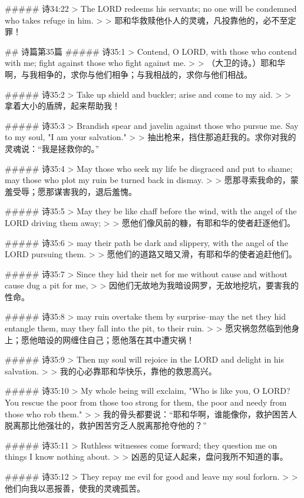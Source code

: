 ##### 诗34:22
> The LORD redeems his servants; no one will be condemned who takes refuge in him.
>
> 耶和华救赎他仆人的灵魂，凡投靠他的，必不至定罪！


## 诗篇第35篇
##### 诗35:1
> Contend, O LORD, with those who contend with me; fight against those who fight against me.
>
> （大卫的诗。）耶和华啊，与我相争的，求你与他们相争；与我相战的，求你与他们相战。


##### 诗35:2
> Take up shield and buckler; arise and come to my aid.
>
> 拿着大小的盾牌，起来帮助我！


##### 诗35:3
> Brandish spear and javelin against those who pursue me. Say to my soul, "I am your salvation."
>
> 抽出枪来，挡住那追赶我的。求你对我的灵魂说：“我是拯救你的。”


##### 诗35:4
> May those who seek my life be disgraced and put to shame; may those who plot my ruin be turned back in dismay.
>
> 愿那寻索我命的，蒙羞受辱；愿那谋害我的，退后羞愧。


##### 诗35:5
> May they be like chaff before the wind, with the angel of the LORD driving them away;
>
> 愿他们像风前的糠，有耶和华的使者赶逐他们。


##### 诗35:6
> may their path be dark and slippery, with the angel of the LORD pursuing them.
>
> 愿他们的道路又暗又滑，有耶和华的使者追赶他们。


##### 诗35:7
> Since they hid their net for me without cause and without cause dug a pit for me,
>
> 因他们无故地为我暗设网罗，无故地挖坑，要害我的性命。


##### 诗35:8
> may ruin overtake them by surprise--may the net they hid entangle them, may they fall into the pit, to their ruin.
>
> 愿灾祸忽然临到他身上；愿他暗设的网缠住自己；愿他落在其中遭灾祸！


##### 诗35:9
> Then my soul will rejoice in the LORD and delight in his salvation.
>
> 我的心必靠耶和华快乐，靠他的救恩高兴。


##### 诗35:10
> My whole being will exclaim, "Who is like you, O LORD? You rescue the poor from those too strong for them, the poor and needy from those who rob them."
>
> 我的骨头都要说：“耶和华啊，谁能像你，救护困苦人脱离那比他强壮的，救护困苦穷乏人脱离那抢夺他的？”


##### 诗35:11
> Ruthless witnesses come forward; they question me on things I know nothing about.
>
> 凶恶的见证人起来，盘问我所不知道的事。


##### 诗35:12
> They repay me evil for good and leave my soul forlorn.
>
> 他们向我以恶报善，使我的灵魂孤苦。


